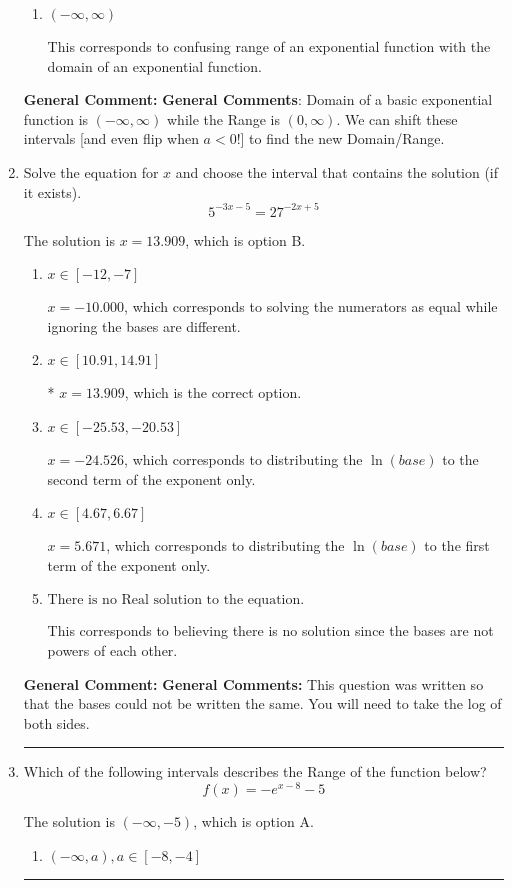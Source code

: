 \documentclass{extbook}[14pt]
\newcommand{\litem}[1]{\item #1

\rule{\textwidth}{0.4pt}}
\begin{document}
\begin{enumerate}
{\begin{enumerate}[label=\Alph*.]
$[-9, \infty)$, which corresponds to using the negative vertical shift AND flipping the Range interval AND including the endpoint.
\item \( (-\infty, \infty) \)

This corresponds to confusing range of an exponential function with the domain of an exponential function.
\end{enumerate}

\textbf{General Comment:} \textbf{General Comments}: Domain of a basic exponential function is $(-\infty, \infty)$ while the Range is $(0, \infty)$. We can shift these intervals [and even flip when $a<0$!] to find the new Domain/Range.
}
\litem{
Solve the equation for $x$ and choose the interval that contains the solution (if it exists).
\[ 5^{-3x-5} = 27^{-2x+5} \]

The solution is \( x = 13.909 \), which is option B.\begin{enumerate}[label=\Alph*.]
\item \( x \in [-12, -7] \)

$x = -10.000$, which corresponds to solving the numerators as equal while ignoring the bases are different.
\item \( x \in [10.91, 14.91] \)

* $x = 13.909$, which is the correct option.
\item \( x \in [-25.53, -20.53] \)

$x = -24.526$, which corresponds to distributing the $\ln(base)$ to the second term of the exponent only.
\item \( x \in [4.67, 6.67] \)

$x = 5.671$, which corresponds to distributing the $\ln(base)$ to the first term of the exponent only.
\item \( \text{There is no Real solution to the equation.} \)

This corresponds to believing there is no solution since the bases are not powers of each other.
\end{enumerate}

\textbf{General Comment:} \textbf{General Comments:} This question was written so that the bases could not be written the same. You will need to take the log of both sides.
}
\litem{
Which of the following intervals describes the Range of the function below?
\[ f(x) = -e^{x-8}-5 \]

The solution is \( (-\infty, -5) \), which is option A.\begin{enumerate}[label=\Alph*.]
\item \( (-\infty, a), a \in [-8, -4] \)


\end{enumerate}}
\end{enumerate}
\end{document}
